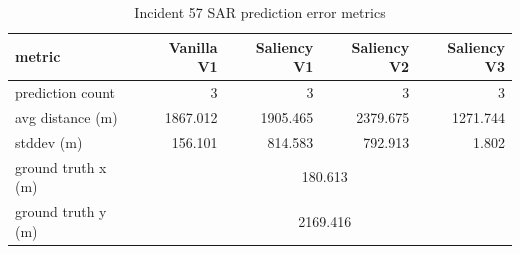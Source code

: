 \begin{table}[ht]
\centering
\caption{Incident 57 SAR prediction error metrics}
\label{tab:sar-incident-57}
\begin{tabular}{lrrrr}
\hline
metric & Vanilla V1 & Saliency V1 & Saliency V2 & Saliency V3 \\
\hline
prediction count & 3 & 3 & 3 & 3 \\
avg distance (m) & 1867.012 & 1905.465 & 2379.675 & 1271.744 \\
stddev (m) & 156.101 & 814.583 & 792.913 & 1.802 \\
ground truth x (m) & \multicolumn{4}{c}{180.613} \\
ground truth y (m) & \multicolumn{4}{c}{2169.416} \\
\hline
\end{tabular}
\end{table}
